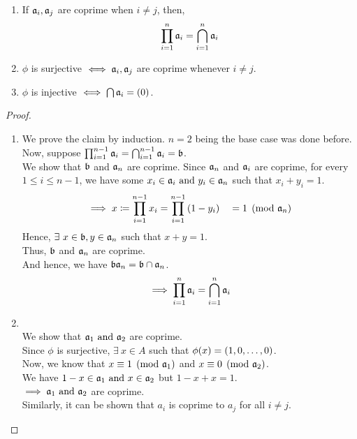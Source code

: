 \begin{proposition}{}{}
	\begin{enumerate}
		\item If \( \mathfrak{a}_i, \mathfrak{a}_j \) are coprime when \( i \neq j \), then,
		\[
			\prod_{i=1}^n \mathfrak{a}_i = \bigcap_{i=1}^n \mathfrak{a}_i
		\]

		\item \( \phi \) is surjective \( \iff \mathfrak{a}_i, \mathfrak{a}_j \)
		are coprime whenever \( i \neq j \).

		\item \( \phi \) is injective \( \iff \bigcap \mathfrak{a}_i = \left( 0 \right) \).
	\end{enumerate}
\end{proposition}
\begin{proof}
	\
	\begin{enumerate}
		\item We prove the claim by induction.
		\( n = 2 \) being the base case was done before. \\
		Now, suppose \( \prod_{i=1}^{n-1} \mathfrak{a}_i =
		\bigcap_{i=1}^{n-1} \mathfrak{a}_i = \mathfrak{b} \). \\
		We show that \( \mathfrak{b} \) and \( \mathfrak{a}_n \) are coprime.
		Since \( \mathfrak{a}_n \) and \( \mathfrak{a}_i \) are coprime, for every
		\( 1 \leq i \leq n-1 \), we have some \( x_i \in \mathfrak{a}_i \text{ and }
		y_i \in \mathfrak{a}_n \) such that \( x_i + y_i = 1 \).
		\[
			\implies x \coloneqq \prod_{i=1}^{n-1} x_i =
			\prod_{i=1}^{n-1} \left( 1-y_i \right) \quad = 1 \pmod{\mathfrak{a}_n}
		\]
		Hence, \( \exists\ x \in \mathfrak{b}, y \in \mathfrak{a}_n \)
		such that \( x + y = 1 \). \\
		Thus, \( \mathfrak{b} \) and \( \mathfrak{a}_n \) are coprime. \\
		And hence, we have \( \mathfrak{b} \mathfrak{a}_n = \mathfrak{b} \cap \mathfrak{a}_n \).
		\[
			\implies \prod_{i=1}^n \mathfrak{a}_i = \bigcap_{i=1}^n \mathfrak{a}_i
		\]

		\item \brak{\implies} \\
		We show that \( \mathfrak{a}_1 \text{ and } \mathfrak{a}_2 \) are coprime. \\
		Since \( \phi \) is surjective, \( \exists\ x \in A \)
		such that \( \phi(x) = \left( 1, 0, \ldots, 0 \right) \). \\
		Now, we know that \( x \equiv 1 \pmod{\mathfrak{a}_1} \) and
		\( x \equiv 0 \pmod{\mathfrak{a}_2} \). \\
		We have \( 1-x \in \mathfrak{a}_1 \text{ and } x \in \mathfrak{a}_2 \) but
		\( 1-x + x = 1 \). \\
		\( \implies \mathfrak{a}_1 \text{ and } \mathfrak{a}_2 \) are coprime. \\
		Similarly, it can be shown that \( a_i \) is coprime
		to \( a_j \) for all \( i \neq j \).


\end{enumerate}
\end{proof}
